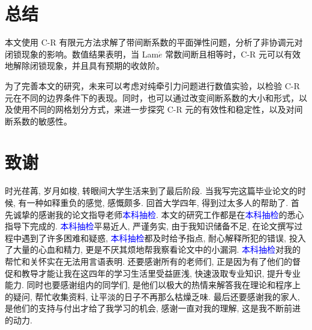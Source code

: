 \documentclass[a4paper,UTF8,titlepage,10pt]{ctexart}
\numberwithin{equation}{subsection}
\renewcommand\appendix{\par
	\setcounter{section}{0}
	\setcounter{subsection}{0}
	\gdef\thesection{附录 \Alph{section}}}
\begin{document}
\newpage

\section{总结}

本文使用 C-R 有限元方法求解了带间断系数的平面弹性问题，分析了非协调元对闭锁现象的影响。数值结果表明，当 Lam$\acute{e}$ 常数间断且相等时，C-R 元可以有效地解除闭锁现象，并且具有预期的收敛阶。

为了完善本文的研究，未来可以考虑对纯牵引力问题进行数值实验，以检验 C-R 元在不同的边界条件下的表现。同时，也可以通过改变间断系数的大小和形式，以及使用不同的网格划分方式，来进一步探究 C-R 元的有效性和稳定性，以及对间断系数的敏感性。

\newpage
\vfill


\clearpage
{}
{}


\newpage

\section*{致谢}

时光荏苒, 岁月如梭, 转眼间大学生活来到了最后阶段. 当我写完这篇毕业论文的时候, 有一种如释重负的感觉, 感慨颇多. 回首大学四年, 得到过太多人的帮助了. 首先诚挚的感谢我的论文指导老师\textcolor{blue}{本科抽检}. 本文的研究工作都是在\textcolor{blue}{本科抽检}的悉心指导下完成的. \textcolor{blue}{本科抽检}平易近人, 严谨务实, 由于我知识储备不足, 在论文撰写过程中遇到了许多困难和疑惑, \textcolor{blue}{本科抽检}都及时给予指点, 耐心解释所犯的错误, 投入了大量的心血和精力, 更是不厌其烦地帮我察看论文中的小漏洞. \textcolor{blue}{本科抽检}对我的帮忙和关怀实在无法用言语表明. 还要感谢所有的老师们, 正是因为有了他们的督促和教导才能让我在这四年的学习生活里受益匪浅, 快速汲取专业知识, 提升专业能力. 同时也要感谢组内的同学们, 是他们以极大的热情来解答我在理论和程序上的疑问, 帮忙收集资料, 让平淡的日子不再那么枯燥乏味. 最后还要感谢我的家人, 是他们的支持与付出才给了我学习的机会, 感谢一直对我的理解, 这是我不断前进的动力. 

\iffalse
\newpage

\appendix
\end{document}
